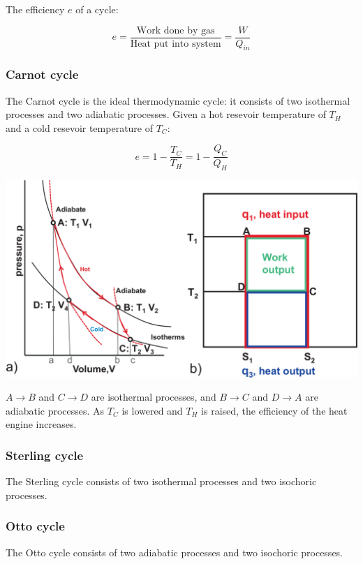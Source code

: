 \documentclass[12pt]{article}
\begin{document}
The efficiency $e$ of a cycle:

\[
e = \frac{\text{Work done by gas}}{\text{Heat put into system}} = \boxed{\frac{W}{Q_{in}}}
\]

\subsubsection{Carnot cycle}

The Carnot cycle is the ideal thermodynamic cycle: it consists of two isothermal processes and two adiabatic processes.
Given a hot resevoir temperature of $T_H$ and a cold resevoir temperature of $T_C$:

\[
\boxed{
e = 1 - \frac{T_C}{T_H} = 1 - \frac{Q_C}{Q_H}
}
\]

\includegraphics[width = 6.5in]{carnot_cycle_pv_ts.png}

$A \longrightarrow B$ and $C \longrightarrow D$ are isothermal processes, and $B \longrightarrow C$ and $D \longrightarrow A$ are adiabatic processes.
As $T_C$ is lowered and $T_H$ is raised, the efficiency of the heat engine increases.

\subsubsection{Sterling cycle}

The Sterling cycle consists of two isothermal processes and two isochoric processes.

\subsubsection{Otto cycle}

The Otto cycle consists of two adiabatic processes and two isochoric processes.

\newpage
\end{document}
